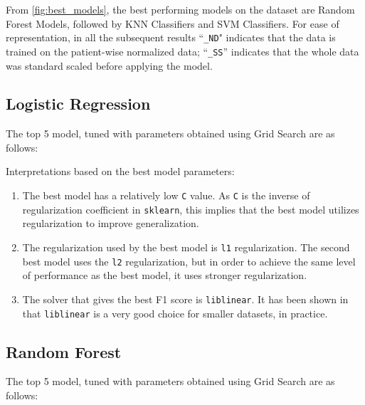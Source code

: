 \documentclass[11pt,a4paper]{article}
\newcommand{\noi}{\noindent}
\begin{document}
\noi
From \autoref{fig:best_models}, the best performing models on the dataset are Random Forest Models, followed by KNN Classifiers and SVM Classifiers. For ease of representation, in all the subsequent results ``\texttt{\_ND}" indicates that the data is trained on the patient-wise normalized data; ``\texttt{\_SS}'' indicates that the whole data was standard scaled before applying the model. 

\subsection{Logistic Regression}
The top 5 model, tuned with parameters obtained using Grid Search are as follows:


\noi
Interpretations based on the best model parameters:
\begin{enumerate}
	\itemsep0em
	\item The best model has a relatively low \texttt{C} value. As \texttt{C} is the inverse of regularization coefficient in \texttt{sklearn}, this implies that the best model utilizes regularization to improve generalization.
	\item The regularization used by the best model is \texttt{l1} regularization. The second best model uses the \texttt{l2} regularization, but in order to achieve the same level of performance as the best model, it uses stronger regularization.
	\item The solver that gives the best F1 score is \texttt{liblinear}. It has been shown in \cite{fan2008liblinear} that \texttt{liblinear} is a very good choice for smaller datasets, in practice. 
\end{enumerate}

\subsection{Random Forest}
The top 5 model, tuned with parameters obtained using Grid Search are as follows:

\end{document}
